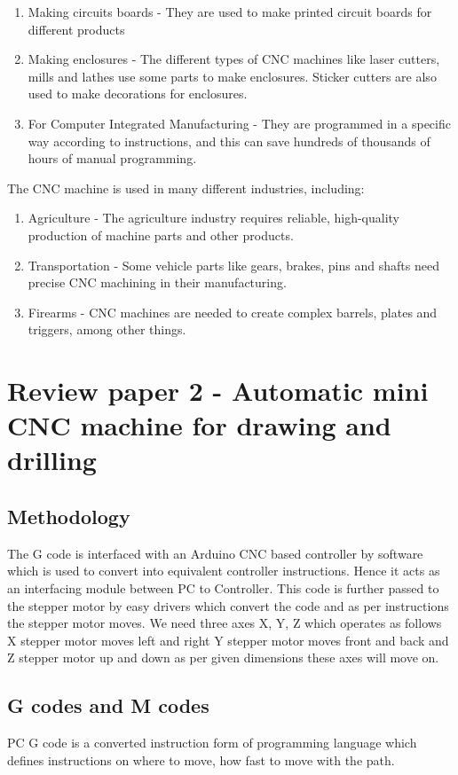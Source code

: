 \begin{enumerate}
 \item Making circuits boards - They are used to make printed circuit boards for different products
 \item Making enclosures - The different types of CNC machines like laser cutters, mills and lathes use some parts to make enclosures. Sticker cutters are also used to make decorations for enclosures.
 \item For Computer Integrated Manufacturing - They are programmed in a specific way according to instructions, and this can save hundreds of thousands of hours of manual programming.
\end{enumerate}

The CNC machine is used in many different industries, including:

\begin{enumerate}
 \item Agriculture - The agriculture industry requires reliable, high-quality production of machine parts and other products.
 \item Transportation - Some vehicle parts like gears, brakes, pins and shafts need precise CNC machining in their manufacturing.
 \item Firearms - CNC machines are needed to create complex barrels, plates and triggers, among other things.
\end{enumerate}

\section{Review paper 2 - Automatic mini CNC machine for drawing and drilling} 

\subsection{Methodology}
\cite{irjet_pap} The G code is interfaced with an Arduino CNC based controller by software which is used to convert into equivalent controller instructions. Hence it acts as an interfacing module between PC to Controller. This code is further passed to the stepper motor by easy drivers which convert the code and as per instructions the stepper motor moves. We need three axes X, Y, Z which operates as follows X stepper motor moves left and right Y stepper motor moves front and back and Z stepper motor up and down as per given dimensions these axes will move on.

\subsection{G codes and M codes}
PC G code is a converted instruction form of programming language which defines instructions on where to move, how fast to move with the path.

